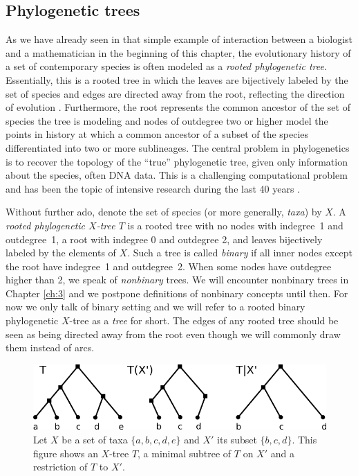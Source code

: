 \subsection*{Phylogenetic trees}

As we have already seen in that simple example of interaction between a biologist and a mathematician in the beginning of this chapter, the evolutionary history of a set of contemporary species is often modeled as a \emph{rooted phylogenetic tree}. Essentially, this is a rooted tree in which the leaves are bijectively labeled by the set of species and edges are directed away from the root, reflecting the direction of evolution \cite{SempleSteel2000}. Furthermore, the root represents the common ancestor of the set of species the tree is modeling and nodes of outdegree two or higher model the points in history at which a common ancestor of a subset of the species differentiated into two or more sublineages. The central problem in phylogenetics is to recover the topology of the ``true'' phylogenetic tree, given only information about the species, often DNA data. This is a challenging computational problem and has been the topic of intensive research during the last 40 years \cite{MathEvPhyl,reconstructingevolution,SemSte03}. 


Without further ado, denote the set of species (or more generally, \emph{taxa}) by $X$. A \emph{rooted phylogenetic $X$-tree $T$} is a rooted tree with no nodes with indegree~1 and outdegree~1, a root with indegree 0 and outdegree 2, and leaves bijectively labeled by the elements of $X$. Such a tree is called \emph{binary} if all inner nodes except the root have indegree~1 and outdegree~2. When some nodes have outdegree higher than 2, we speak of \textit{nonbinary} trees. We will encounter nonbinary trees in Chapter \ref{ch:3} and we postpone definitions of nonbinary concepts until then. For now we only talk of binary setting and we will refer to a rooted binary phylogenetic $X$-tree as a \emph{tree} for short. The edges of any rooted tree should be seen as being directed away from the root even though we will commonly draw them instead of arcs.

  \begin{figure}[t]
    \centering
     \includegraphics[width=0.7 \textwidth]{../figs/ch1/introtree.png}
    \caption{Let $X$ be a set of taxa $\{a,b,c,d,e\}$ and $X'$ its subset $\{b,c,d\}$. This figure shows an $X$-tree $T$, a minimal subtree of $T$ on $X'$ and a restriction of $T$ to $X'$.}
    \label{fig:introtree}
  \end{figure}


